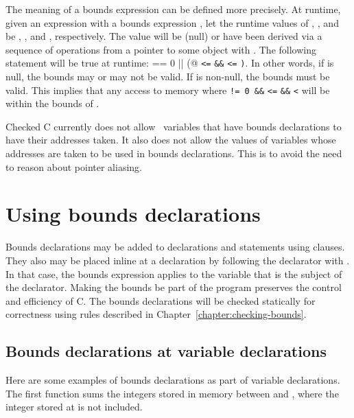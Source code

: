 The meaning of a bounds expression can be defined more precisely. At
runtime, given an expression  with a bounds expression
, let the runtime
values of , , and  be , ,
and , respectively. The value  will be  (null) or
have been derived via a sequence of operations from a pointer to some
object  with .
The following statement will be true at runtime:
 \lstinline@== 0 || (@ \lstinline|<=|  \lstinline|&&|
 \lstinline|<=| \lstinline|)|. In other words,
if  is null, the bounds
may or may not be valid. If  is non-null, the bounds must be
valid. This implies that any access to memory where 
\lstinline|!= 0 &&|  \lstinline|<=|  \lstinline|&&| 
\lstinline|<|  will be within the bounds of .

Checked C currently does not allow \arrayptr\ variables that have bounds declarations to have
their addresses taken. It also does not allow the values of variables
whose addresses are taken to be used in bounds declarations. This is to avoid
the need to reason about pointer aliasing.

\section{Using bounds declarations}

Bounds declarations may be added to declarations and statements using
 clauses. They also may be placed inline at a declaration
by following the declarator with \code{:} . In that
case, the bounds expression applies to the variable that is the subject
of the declarator. Making the bounds be part of the program preserves the
control and efficiency of C. The bounds declarations will be checked statically
for correctness using rules described in
Chapter~\ref{chapter:checking-bounds}.

\subsection{Bounds declarations at variable declarations}
\label{section:variable-declarations}

Here are some examples of bounds declarations as part of variable
declarations. The first function sums the integers stored in memory
between  and , where the integer stored at
 is not included.

